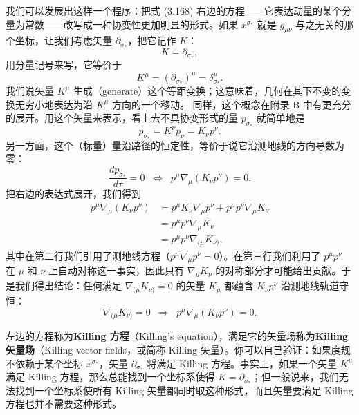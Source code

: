 我们可以发展出这样一个程序：把式 (3.168) 右边的方程——它表达动量的某个分量为常数——改写成一种协变性更加明显的形式。如果 $x^{\sigma_*}$ 就是 $g_{\mu\nu}$ 与之无关的那个坐标，让我们考虑矢量 $\partial_{\sigma_*}$，把它记作 $K$：
\begin{equation*}
K = \partial_{\sigma_*},
\tag{3.169}
\end{equation*}
用分量记号来写，它等价于
\begin{equation*}
K^\mu = (\partial_{\sigma_*})^\mu = \delta^\mu_{\sigma_*}.
\tag{3.170}
\end{equation*}
我们说矢量 $K^\mu$ 生成（generate）这个等距变换；这意味着，几何在其下不变的变换无穷小地表达为沿 $K^\mu$ 方向的一个移动。
同样，这个概念在附录 B 中有更充分的展开。用这个矢量来表示，看上去不具协变形式的量 $p_{\sigma_*}$ 就简单地是
\begin{equation*}
p_{\sigma_*} = K^\nu p_\nu = K_\nu p^\nu.
\tag{3.171}
\end{equation*}
另一方面，这个（标量）量沿路径的恒定性，等价于说它沿测地线的方向导数为零：
\begin{equation*}
\frac{dp_{\sigma_*}}{d\tau} = 0 \;\;\Longleftrightarrow\;\; p^\mu\nabla_\mu(K_\nu p^\nu) = 0.
\tag{3.172}
\end{equation*}
把右边的表达式展开，我们得到
\begin{align*}
p^\mu\nabla_\mu(K_\nu p^\nu) &= p^\mu K_\nu\nabla_\mu p^\nu + p^\mu p^\nu\nabla_\mu K_\nu\\
&= p^\mu p^\nu\nabla_\mu K_\nu\\
&= p^\mu p^\nu\nabla_{(\mu}K_{\nu)},
\tag{3.173}
\end{align*}
其中在第二行我们引用了测地线方程（$p^\mu\nabla_\mu p^\nu = 0$）。在第三行我们利用了 $p^\mu p^\nu$ 在 $\mu$ 和 $\nu$ 上自动对称这一事实，因此只有 $\nabla_\mu K_\nu$ 的对称部分才可能给出贡献。于是我们得出结论：任何满足 $\nabla_{(\mu}K_{\nu)} = 0$ 的矢量 $K_\mu$ 都蕴含 $K_\nu p^\nu$ 沿测地线轨道守恒：
\begin{equation*}
\nabla_{(\mu}K_{\nu)} = 0 \;\;\Rightarrow\;\; p^\mu\nabla_\mu(K_\nu p^\nu) = 0.
\tag{3.174}
\end{equation*}

左边的方程称为\textbf{Killing 方程}（Killing's equation），满足它的矢量场称为\textbf{Killing 矢量场}（Killing vector fields，或简称 Killing 矢量）。你可以自己验证：如果度规不依赖于某个坐标 $x^{\sigma_*}$，矢量 $\partial_{\sigma_*}$ 将满足 Killing 方程。事实上，如果一个矢量 $K^\mu$ 满足 Killing 方程，那么总能找到一个坐标系使得 $K = \partial_{\sigma_*}$；但一般说来，我们无法找到一个坐标系使所有 Killing 矢量都同时取这种形式，而且矢量要满足 Killing 方程也并不需要这种形式。

